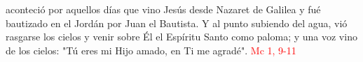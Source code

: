 aconteció por aquellos días que vino Jesús desde Nazaret de Galilea y fué bautizado en el Jordán por Juan el Bautista.
Y al punto subiendo del agua, vió rasgarse los cielos y venir sobre Él el Espíritu Santo como paloma; y una voz vino de los cielos: 
"Tú eres mi Hijo amado, en Ti me agradé". \textcolor{red}{Mc 1, 9-11}